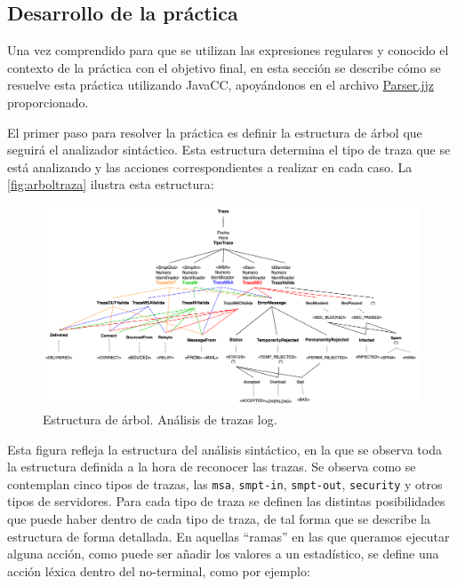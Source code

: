 \subsection{Desarrollo de la práctica}

Una vez comprendido para que se utilizan las expresiones regulares y conocido el contexto de la práctica con el objetivo final, en esta sección se describe cómo se resuelve esta práctica utilizando JavaCC, apoyándonos en el archivo \hyperref[sec:P2Parser]{Parser.jjz} proporcionado.

El primer paso para resolver la práctica es definir la estructura de árbol que seguirá el analizador sintáctico. Esta estructura determina el tipo de traza que se está analizando y las acciones correspondientes a realizar en cada caso. La \autoref{fig:arboltraza} ilustra esta estructura:

\begin{figure}[H]
    \centering
    \includegraphics[width=\textwidth]{imagenes/arboltraza.png}
    \caption{Estructura de árbol. Análisis de trazas log.}
    \label{fig:arboltraza}
\end{figure}

Esta figura refleja la estructura del análisis sintáctico, en la que se observa toda la estructura definida a la hora de reconocer las trazas. Se observa como se contemplan cinco tipos de trazas, las \lstinline|msa|, \lstinline|smpt-in|, \lstinline|smpt-out|, \lstinline|security| y otros tipos de servidores. Para cada tipo de traza se definen las distintas posibilidades que puede haber dentro de cada tipo de traza, de tal forma que se describe la estructura de forma detallada. En aquellas ``ramas'' en las que queramos ejecutar alguna acción, como puede ser añadir los valores a un estadístico, se define una acción léxica dentro del no-terminal, como por ejemplo:


